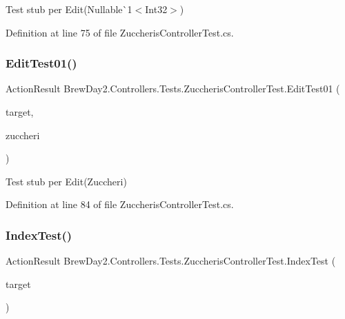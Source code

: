 Test stub per Edit(Nullable\`{}1$<$Int32$>$)



Definition at line 75 of file Zuccheris\+Controller\+Test.\+cs.

\mbox{\label{class_brew_day2_1_1_controllers_1_1_tests_1_1_zuccheris_controller_test_a71260f0c81d9ee6b913fd5b2d732a03e}} 
\subsubsection{\texorpdfstring{Edit\+Test01()}{EditTest01()}}
{\footnotesize\ttfamily Action\+Result Brew\+Day2.\+Controllers.\+Tests.\+Zuccheris\+Controller\+Test.\+Edit\+Test01 (\begin{DoxyParamCaption}\item[{\mbox{[}\+Pex\+Assume\+Under\+Test\mbox{]} \mbox{\hyperlink{class_brew_day2_1_1_controllers_1_1_zuccheris_controller}{Zuccheris\+Controller}}}]{target,  }\item[{\mbox{\hyperlink{class_brew_day2_1_1_models_1_1_zuccheri}{Zuccheri}}}]{zuccheri }\end{DoxyParamCaption})}



Test stub per Edit(\+Zuccheri)



Definition at line 84 of file Zuccheris\+Controller\+Test.\+cs.

\mbox{\label{class_brew_day2_1_1_controllers_1_1_tests_1_1_zuccheris_controller_test_af73879bca38b063e16c86425c89fecd6}} 
\subsubsection{\texorpdfstring{Index\+Test()}{IndexTest()}}
{\footnotesize\ttfamily Action\+Result Brew\+Day2.\+Controllers.\+Tests.\+Zuccheris\+Controller\+Test.\+Index\+Test (\begin{DoxyParamCaption}\item[{\mbox{[}\+Pex\+Assume\+Under\+Test\mbox{]} \mbox{\hyperlink{class_brew_day2_1_1_controllers_1_1_zuccheris_controller}{Zuccheris\+Controller}}}]{target }\end{DoxyParamCaption})}



